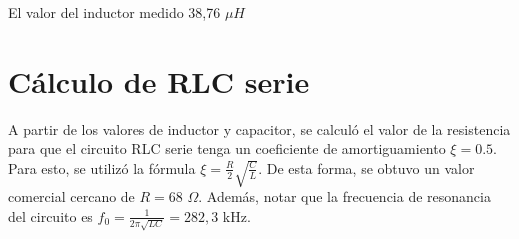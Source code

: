 \documentclass{article}
\begin{document}
	El valor del inductor medido 38,76 $\mu H$
\section{Cálculo de RLC serie}
A partir de los valores de inductor y capacitor, se calculó el valor 
de la resistencia para que el circuito RLC serie tenga un coeficiente 
de amortiguamiento $\xi=0.5$. Para esto, se utilizó la fórmula
 $\xi = \frac{R}{2} \sqrt{\frac{C}{L}}$. De esta forma, se obtuvo un valor comercial cercano
 de $R = 68 $ $\Omega$. Además, notar que la frecuencia de resonancia del circuito es $f_0 = \frac{1}{2\pi \sqrt{LC}} = 282,3$ kHz.






















        
\end{document}
